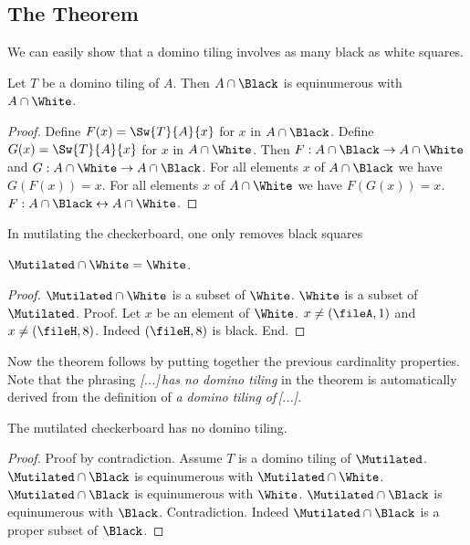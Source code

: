\subsection{The Theorem}

\noindent We can easily show that a domino tiling involves as many black as white squares.

\begin{forthel}
    \begin{lemma}
        Let $T$ be a domino tiling of $A$. Then $A \cap \Black$ is
        equinumerous with $A \cap \White$.
    \end{lemma}
    \begin{proof}
        Define $F(x) = \Sw{T}{A}{x}$ for $x$ in $A \cap \Black$.
        Define $G(x) = \Sw{T}{A}{x}$ for $x$ in $A \cap \White$.
        Then $F: A \cap \Black \to A \cap \White$ and
        $G: A \cap \White \to A \cap \Black$.
        For all elements $x$ of $A \cap \Black$ we have $G(F(x))=x$.
        For all elements $x$ of $A \cap \White$ we have $F(G(x))=x$.
        $F : A \cap \Black \leftrightarrow A \cap \White$.
    \end{proof}
\end{forthel}

\noindent In mutilating the checkerboard, one only removes black squares

\begin{forthel}
    \begin{lemma}
        $\Mutilated \cap \White = \White$.
    \end{lemma}
    \begin{proof}
        $\Mutilated \cap \White$ is a subset of $\White$.
        $\White$ is a subset of $\Mutilated$.
        Proof.
            Let $x$ be an element of $\White$.
            $x \neq (\fileA, 1)$ and $x \neq (\fileH,8)$.
            Indeed $(\fileH, 8)$ is black.
        End.
    \end{proof}
\end{forthel}

\noindent Now the theorem follows by putting together the previous cardinality properties.
Note that the phrasing \textit{[...]\,has no domino tiling} in the theorem is automatically derived from the definition of \textit{a domino tiling of\,[...]}.

\begin{forthel}
    \begin{theorem}
        The mutilated checkerboard has no domino tiling.
    \end{theorem}
    \begin{proof}
        Proof by contradiction.
        Assume $T$ is a domino tiling of $\Mutilated$.
        $\Mutilated \cap \Black$ is equinumerous with $\Mutilated \cap \White$.
        $\Mutilated \cap \Black$ is equinumerous with $\White$.
        $\Mutilated \cap \Black$ is equinumerous with $\Black$.
        Contradiction. Indeed $\Mutilated \cap \Black$ is a proper subset of $\Black$.
    \end{proof}
\end{forthel}
